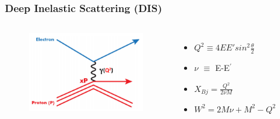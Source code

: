 \documentclass[12pt,usenames,dvipsnames]{beamer}
\begin{document}
\begin{frame}
\frametitle{Deep Inelastic Scattering (DIS)}
\vspace*{-20pt}
\begin{columns}[c] %
	\begin{figure}
		\includegraphics[width =5cm]{../images/DIS_toon.png}
	\end{figure}
	\pause
	\begin{itemize}
		\item $ Q^2 \equiv 4EE' sin^2 \frac{\theta}{2} $
		\pause
		\item $\nu$ $\equiv$ E-E$^{\prime}$
		\pause
		\item $X_{Bj}= \frac{Q^2}{2\nu M}$
		\pause
		\item  $W^2 = 2M\nu + M^2 - Q^2$
		
	\end{itemize}
\end{columns}
\vspace*{10pt}

\end{frame}
\end{document}
